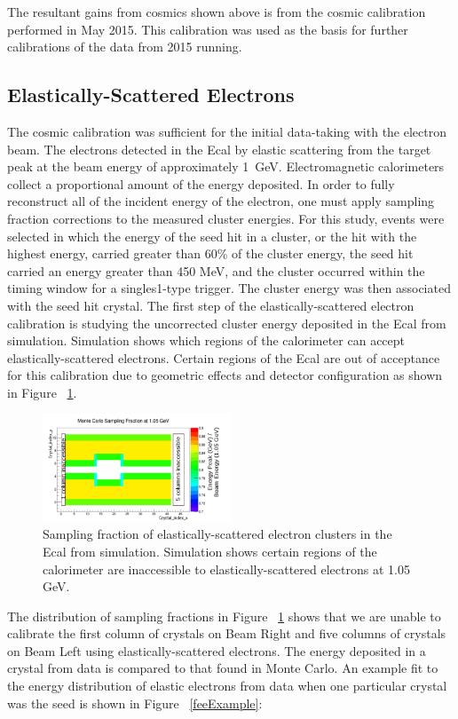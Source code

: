 \documentclass[twoside]{article}
\begin{document}
\begin{multicols}{2}
The resultant gains from cosmics shown above is from the cosmic calibration performed in May 2015. This calibration was used as the basis for further calibrations of the data from 2015 running. 	
	
\subsection{Elastically-Scattered Electrons}
The cosmic calibration was sufficient for the initial data-taking with the electron beam.  The  electrons detected in the Ecal by elastic scattering from the target peak at the beam energy of approximately 1~GeV. Electromagnetic calorimeters collect a proportional amount of the energy deposited. In order to fully reconstruct all of the incident energy of the electron, one must apply sampling fraction corrections to the measured cluster energies. For this study, events were selected in which the energy of the seed hit in a cluster, or the hit with the highest energy, carried greater than 60\% of the cluster energy, the seed hit carried an energy greater than 450 MeV, and the cluster occurred within the timing window for a singles1-type trigger. The cluster energy was then associated with the seed hit crystal. The first step of the elastically-scattered electron calibration is studying the uncorrected cluster energy deposited in the Ecal from simulation. Simulation shows which regions of the calorimeter can accept elastically-scattered electrons. Certain regions of the Ecal are out of acceptance for this calibration due to geometric effects and detector configuration as shown in Figure ~\ref{fee_sim}. 
	
\begin{figure}[H]
  \centering
      \includegraphics[width=0.5\textwidth]{pics/fee_acceptance.png}
  \caption{Sampling fraction of elastically-scattered electron clusters in the Ecal from simulation. Simulation shows certain regions of the calorimeter are inaccessible to elastically-scattered electrons at 1.05 GeV.}
  \label{fee_sim}
\end{figure}	
	
	The distribution of sampling fractions in Figure ~\ref{fee_sim} shows that we are unable to calibrate the first column of crystals on Beam Right and five columns of crystals on Beam Left using elastically-scattered electrons. The energy deposited in a crystal from data is compared to that found in Monte Carlo. An example fit to the energy distribution of elastic electrons from data when one particular crystal was the seed is shown in Figure ~\ref{feeExample}:
	

\end{multicols}
\end{document}
